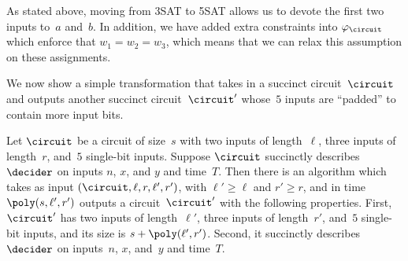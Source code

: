 As stated above, moving from 3SAT to 5SAT allows us to devote the first two
inputs to~$a$ and~$b$.
In addition, we have added extra constraints into $\varphi_{\circuit}$ which
enforce that $w_1 = w_2 = w_3$, which means that we can relax this assumption on
these assignments.

We now show a simple transformation that takes in a succinct circuit~$\circuit$
and outputs another succinct circuit~$\circuit'$ whose~$5$ inputs are ``padded''
to contain more input bits.




\begin{proposition}[Padding]\label{prop:exciting-padding-prop}
  Let $\circuit$ be a circuit of size~$s$ with two inputs of length~$\ell$,
  three inputs of length~$r$, and~$5$ single-bit inputs.
  Suppose $\circuit$ succinctly describes $\decider$ on inputs $n$, $x$, and $y$
  and time~$T$.
  Then there is an algorithm which takes as input $(\circuit, \ell, r, \ell',
  r')$, with $\ell' \geq \ell$ and $r' \geq r$, and in time~$\poly(s, \ell',
  r')$ outputs a circuit~$\circuit'$ with the following properties.
  First, $\circuit'$ has two inputs of length~$\ell'$, three inputs of
  length~$r'$, and~$5$ single-bit inputs, and its size is $s + \poly(\ell',
  r')$.
  Second, it succinctly describes $\decider$ on inputs~$n$, $x$, and~$y$ and
  time~$T$.
\end{proposition}
